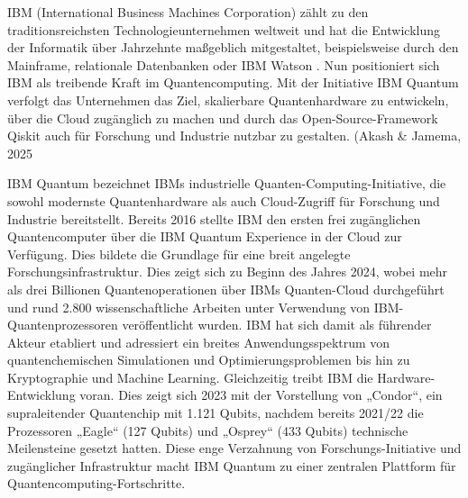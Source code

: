 IBM (International Business Machines Corporation) zählt zu den traditionsreichsten Technologieunternehmen weltweit und hat die Entwicklung der Informatik über Jahrzehnte maßgeblich mitgestaltet, beispielsweise durch den Mainframe, relationale Datenbanken oder IBM Watson \cite{aruteQuantumSupremacyUsing2019a}. Nun positioniert sich IBM als treibende Kraft im Quantencomputing. Mit der Initiative IBM Quantum verfolgt das Unternehmen das Ziel, skalierbare Quantenhardware zu entwickeln, über die Cloud zugänglich zu machen und durch das Open-Source-Framework Qiskit auch für Forschung und Industrie nutzbar zu gestalten. \cite{} (Akash & Jamema, 2025 \cite{miceliQuantumComputationVisualization2018} 

IBM Quantum bezeichnet IBMs industrielle Quanten-Computing-Initiative, die sowohl modernste Quantenhardware als auch Cloud-Zugriff für Forschung und Industrie bereitstellt. Bereits 2016 stellte IBM den ersten frei zugänglichen Quantencomputer über die IBM Quantum Experience in der Cloud zur Verfügung. Dies bildete die Grundlage für eine breit angelegte Forschungsinfrastruktur. Dies zeigt sich zu Beginn des Jahres 2024, wobei mehr als drei Billionen Quantenoperationen über IBMs Quanten-Cloud durchgeführt und rund 2.800 wissenschaftliche Arbeiten unter Verwendung von IBM-Quantenprozessoren veröffentlicht wurden. IBM hat sich damit als führender Akteur etabliert und adressiert ein breites Anwendungsspektrum von quantenchemischen Simulationen und Optimierungsproblemen bis hin zu Kryptographie und Machine Learning. Gleichzeitig treibt IBM die Hardware-Entwicklung voran. Dies zeigt sich 2023 mit der Vorstellung von „Condor“, ein supraleitender Quantenchip mit 1.121 Qubits, nachdem bereits 2021/22 die Prozessoren „Eagle“ (127 Qubits) und „Osprey“ (433 Qubits) technische Meilensteine gesetzt hatten. Diese enge Verzahnung von Forschungs-Initiative und zugänglicher Infrastruktur macht IBM Quantum zu einer zentralen Plattform für Quantencomputing-Fortschritte. \citealp[2]{abughanemIBMQuantumComputers2025}

